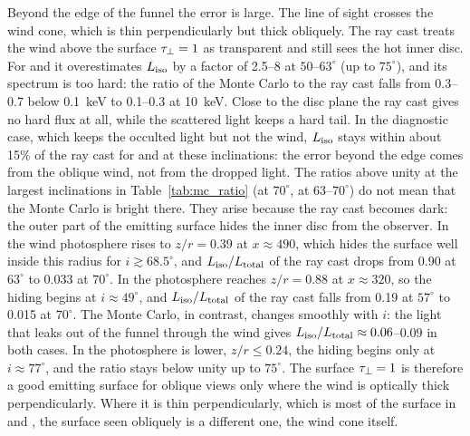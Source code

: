 Beyond the edge of the funnel the error is large.
The line of sight crosses the wind cone, which is thin perpendicularly but thick obliquely.
The ray cast treats the wind above the surface $\tau_\perp = 1$ as transparent and still sees the hot inner disc.
For \srcHoIX and \srcNGCthirteen it overestimates $L_{\rm iso}$ by a factor of 2.5--8 at $50$--$63^\circ$ (\srcNGCthirteen up to $75^\circ$), and its spectrum is too hard: the ratio of the Monte Carlo to the ray cast falls from 0.3--0.7 below 0.1~keV to 0.1--0.3 at 10~keV.
Close to the disc plane the ray cast gives no hard flux at all, while the scattered light keeps a hard tail.
{In the diagnostic case, which keeps the occulted light but not the wind, $L_{\rm iso}$ stays within about 15\% of the ray cast for \srcHoIX and \srcNGCthirteen at these inclinations: the error beyond the edge comes from the oblique wind, not from the dropped light.}
The ratios above unity at the largest inclinations in Table~\ref{tab:mc_ratio} (\srcHoIX at $70^\circ$, \srcNGCfiftyfour at $63$--$70^\circ$) do not mean that the Monte Carlo is bright there.
They arise because the ray cast becomes dark: the outer part of the emitting surface hides the inner disc from the observer.
In \srcHoIX the wind photosphere rises to $z/r = 0.39$ at $x \approx 490$, which hides the surface well inside this radius for $i \gtrsim 68.5^\circ$, and $L_{\rm iso}/L_{\rm total}$ of the ray cast drops from 0.90 at $63^\circ$ to 0.033 at $70^\circ$.
In \srcNGCfiftyfour the photosphere reaches $z/r = 0.88$ at $x \approx 320$, so the hiding begins at $i \approx 49^\circ$, and $L_{\rm iso}/L_{\rm total}$ of the ray cast falls from 0.19 at $57^\circ$ to 0.015 at $70^\circ$.
The Monte Carlo, in contrast, changes smoothly with $i$: the light that leaks out of the funnel through the wind gives $L_{\rm iso}/L_{\rm total} \approx 0.06$--$0.09$ in both cases.
In \srcNGCthirteen the photosphere is lower, $z/r \le 0.24$, the hiding begins only at $i \approx 77^\circ$, and the ratio stays below unity up to $75^\circ$.
The surface $\tau_\perp = 1$ is therefore a good emitting surface for oblique views only where the wind is optically thick perpendicularly.
Where it is thin perpendicularly, which is most of the surface in \srcHoIX and \srcNGCthirteen, the surface seen obliquely is a different one, the wind cone itself.

